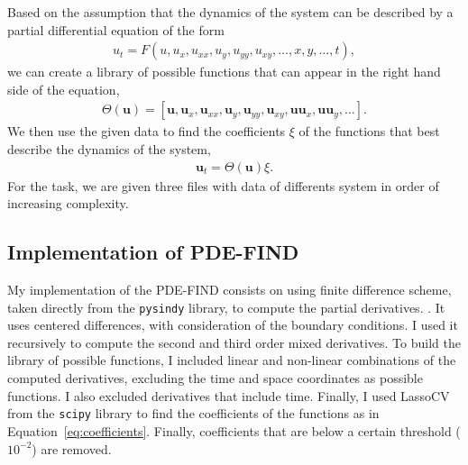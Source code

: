 \documentclass[unicode,11pt,a4paper,oneside,numbers=endperiod,openany]{scrartcl}
\begin{document}
Based on the assumption that the dynamics of the system can be described
by a partial differential equation of the form
\begin{align}\label{eq:pde}
    u_t = F(u, u_x, u_{xx}, u_y, u_{yy}, u_{xy}, \ldots, x, y, \ldots, t),
\end{align}
we can create a library of possible functions that can appear in the right
hand side of the equation,
\begin{align}\label{eq:library}
    \Theta(\mathbf{u}) = [ \mathbf{u}, \mathbf{u}_x, \mathbf{u}_{xx}, \mathbf{u}_y, \mathbf{u}_{yy}, \mathbf{u}_{xy}, \mathbf{u}\mathbf{u}_x, \mathbf{u}\mathbf{u}_y, \ldots ].
\end{align}
We then use the given data to find the coefficients $\xi$ of the
functions that best describe the dynamics of the system,
\begin{align}\label{eq:coefficients}
    \mathbf{u}_t = \Theta(\mathbf{u})\xi.
\end{align}
For the task, we are given three files with data of differents system in order of increasing complexity.

\subsection*{Implementation of PDE-FIND}
My implementation of the PDE-FIND consists on using finite difference scheme,
taken directly from the \texttt{pysindy} library, to compute the partial derivatives.
\cite{PDEFIND}. It uses centered differences, with consideration of the boundary conditions.
I used it recursively to compute the second and third order
mixed derivatives.
To build the library of possible functions, I included linear and non-linear
combinations of the computed derivatives, excluding
the time and space coordinates as possible functions. I also excluded
derivatives that include time.
Finally, I used LassoCV from the \texttt{scipy} library to find the coefficients of the functions as in
Equation~\eqref{eq:coefficients}. Finally,
coefficients that are below a certain threshold ($10^{-2}$) are removed.
\end{document}
